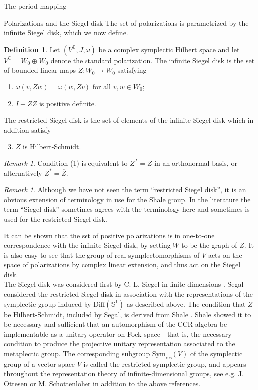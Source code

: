 \documentclass[12pt]{amsart}
\theoremstyle{plain}
\theoremstyle{definition}
\newtheorem{definition}[theorem]{Definition}
\theoremstyle{remark}
\newtheorem{remark}[theorem]{Remark}
\numberwithin{equation}{section} %
\numberwithin{figure}{section} %
\begin{document}
\begin{section}{The period mapping}
\begin{subsection}{Polarizations and the Siegel disk}
  The set of polarizations is parametrized by the infinite Siegel disk, which we now define. 
  \begin{definition} Let $(V^{\mathbb{C}},J,\omega)$ be a complex symplectic Hilbert space and let $V^{\mathbb{C}} = W_0 \oplus\overline{W_0}$ denote the standard polarization. The infinite Siegel disk is the set of bounded linear maps $Z:\overline{W_0} \rightarrow W_0$ satisfying
  \begin{enumerate}
   \item $\omega(v,Zw)=\omega(w,Zv)$ for all $v,w \in \overline{W_0}$; 
   \item $I-\overline{Z} Z$ is positive definite.
  \end{enumerate}
  The restricted Siegel disk is the set of elements of the infinite Siegel disk which in addition satisfy 
  \begin{enumerate} \setcounter{enumi}{2}
   \item $Z$ is Hilbert-Schmidt.
  \end{enumerate}
  \end{definition}
  \begin{remark}
  Condition (1) is equivalent to $Z^T=Z$ in an orthonormal basis, or alternatively ${Z}^*=\overline{Z}$.
  \end{remark}
  \begin{remark} Although we have not seen the term ``restricted Siegel disk'', it is an obvious extension of terminology in use for the Shale group. In the literature the term ``Siegel disk'' sometimes agrees with the terminology here and sometimes is used for the restricted Siegel disk.    
  \end{remark}
  It can be shown that the set of positive polarizations is in one-to-one correspondence with the infinite Siegel disk, by setting $W$ to be the graph of $Z$.  
  It is also easy to see that the group of real symplectomorphisms of $V$ acts on the space of polarizations by complex linear extension, and thus act on the Siegel disk.\\

  
  The Siegel disk was considered first by C. L. Siegel in finite dimensions \cite{Siegel_symplectic_book}. Segal \cite{SegalUnitary} considered the restricted Siegel disk in association with the representations of the symplectic group induced by $\mathrm{Diff}(\mathbb{S}^1)$ as described above.
  The condition that $Z$ be Hilbert-Schmidt, included by Segal, is derived from Shale \cite{Shale}. Shale showed it to be necessary and sufficient that an automorphism of the CCR algebra be implementable as a unitary operator on Fock space - that is, the necessary condition to produce the projective unitary representation associated to the metaplectic group. The corresponding subgroup $\mathrm{Sym}_{\mathrm{res}}(V)$ of the symplectic group of a vector space $V$ is called the restricted symplectic group, and appears throughout the representation theory of infinite-dimensional groups, see e.g. J. Ottesen \cite{Ottesen} or M. Schottenloher \cite{Schottenloher} in addition to the above references.\\ 


\end{subsection}
\end{section}
\end{document}
